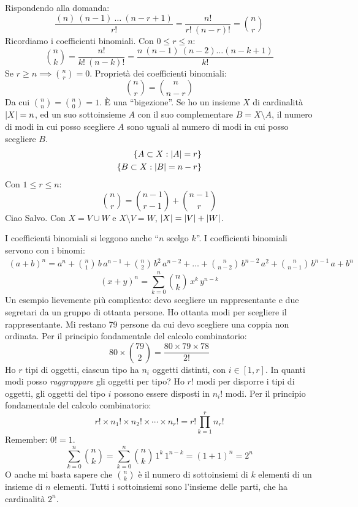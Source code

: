 Rispondendo alla domanda:
\[
\frac{(n) \ (n-1) \ \ldots \ (n - r + 1)}{r!} =
\frac{ n! }{ r! \ (n-r)! } = 
\binom{n}{r}
\]
Ricordiamo i coefficienti binomiali. Con $0 \le r \le n$:
\[
\binom{n}{k} = \frac{n!}{k! \ (n-k)!} = 
\frac{n \ (n - 1) \ (n - 2) \ldots (n - k + 1)}{k!}
\]
Se $r \geq n \implies \binom{n}{r} = 0$. Propriet\`a dei coefficienti binomiali:
\[
\binom{n}{r} = \binom{n}{n-r}
\]
Da cui $\binom{n}{n} = \binom{n}{0} = 1$. \`E una ``bigezione''. Se ho un insieme $X$ di cardinalit\`a $\left\lvert{X}\right\rvert = n$, ed un suo sottoinsieme $A$ con il suo complementare $B = X \setminus A$, il numero di modi in cui posso scegliere $A$ sono uguali al numero di modi in cui posso scegliere $B$.
\begin{align*}
\left\{A \subset X : \left\lvert{A}\right\rvert = r\right\} \\
\left\{B \subset X : \left\lvert{B}\right\rvert = n - r\right\}
\end{align*}
Con $1 \leq r \leq n$:
\[
\binom{n}{r} = \binom{n-1}{r-1} + \binom{n-1}{r}
\]
Ciao Salvo. Con $X = V \cup W$ e $X \setminus V = W$, $\left\lvert{X}\right\rvert = \left\lvert{V}\right\rvert + \left\lvert{W}\right\rvert$.

I coefficienti binomiali si leggono anche ``$n$ scelgo $k$''. I coefficienti binomiali servono con i binomi:
\begin{multline*}
(a+b)^n = 
a^n 
+ \binom{n}{1} \, b \, a^{n-1} 
+ \binom{n}{2} \, b^2 \, a^{n-2} 
+ \ldots 
+ \binom{n}{n-2} \, b^{n-2} \, a^2
+ \binom{n}{n-1} \, b^{n-1} \, a
+ b^n
\end{multline*}
\[
(x+y)^n = \sum_{k=0}^{n} \binom{n}{k} \, x^k \, y^{n-k}
\]
Un esempio lievemente pi\`u complicato: devo scegliere un rappresentante e due segretari da un gruppo di ottanta persone. Ho ottanta modi per scegliere il rappresentante. Mi restano 79 persone da cui devo scegliere una coppia non ordinata. Per il principio fondamentale del calcolo combinatorio:
\[
80 \times \binom{79}{2} = \frac{80 \times 79 \times 78}{2!}
\]
Ho $r$ tipi di oggetti, ciascun tipo ha $n_i$ oggetti distinti, con $i \in [1,r]$. In quanti modi posso \textit{raggruppare} gli oggetti per tipo? Ho $r!$ modi per disporre i tipi di oggetti, gli oggetti del tipo $i$ possono essere disposti in $n_i!$ modi. Per il principio fondamentale del calcolo combinatorio:
\[
r! \times n_1! \times n_2! \times \cdots \times n_r! = 
r! \prod_{k = 1}^{r} n_r!
\]
Remember: $0! = 1$.
\[
\sum_{k=0}^{n} \binom{n}{k} = \sum_{k=0}^{n} \binom{n}{k} \, 1^k \, 1^{n-k} = (1 + 1)^n = 2^n
\]
O anche mi basta sapere che $\binom{n}{k}$ \`e il numero di sottoinsiemi di $k$ elementi di un insieme di $n$ elementi. Tutti i sottoinsiemi sono l'insieme delle parti, che ha cardinalit\`a $2^n$.


